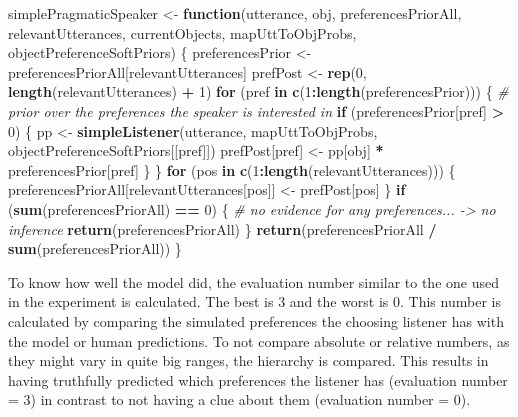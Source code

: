 \documentclass[]{article}
\newenvironment{Shaded}{\begin{snugshade}}{\end{snugshade}}
\newcommand{\CommentTok}[1]{\textcolor[rgb]{0.56,0.35,0.01}{\textit{#1}}}
\newcommand{\ControlFlowTok}[1]{\textcolor[rgb]{0.13,0.29,0.53}{\textbf{#1}}}
\newcommand{\DecValTok}[1]{\textcolor[rgb]{0.00,0.00,0.81}{#1}}
\newcommand{\KeywordTok}[1]{\textcolor[rgb]{0.13,0.29,0.53}{\textbf{#1}}}
\newcommand{\NormalTok}[1]{#1}
\newcommand{\OperatorTok}[1]{\textcolor[rgb]{0.81,0.36,0.00}{\textbf{#1}}}
\newcommand{\StringTok}[1]{\textcolor[rgb]{0.31,0.60,0.02}{#1}}
\begin{document}
\begin{Shaded}
\begin{Highlighting}[]
\NormalTok{simplePragmaticSpeaker <-}
\StringTok{  }\ControlFlowTok{function}\NormalTok{(utterance,}
\NormalTok{           obj,}
\NormalTok{           preferencesPriorAll,}
\NormalTok{           relevantUtterances,}
\NormalTok{           currentObjects,}
\NormalTok{           mapUttToObjProbs,}
\NormalTok{           objectPreferenceSoftPriors) \{}
\NormalTok{    preferencesPrior <-}\StringTok{ }\NormalTok{preferencesPriorAll[relevantUtterances]}
\NormalTok{    prefPost <-}\StringTok{ }\KeywordTok{rep}\NormalTok{(}\DecValTok{0}\NormalTok{, }\KeywordTok{length}\NormalTok{(relevantUtterances) }\OperatorTok{+}\StringTok{ }\DecValTok{1}\NormalTok{)}
    \ControlFlowTok{for}\NormalTok{ (pref }\ControlFlowTok{in} \KeywordTok{c}\NormalTok{(}\DecValTok{1}\OperatorTok{:}\KeywordTok{length}\NormalTok{(preferencesPrior))) \{}
      \CommentTok{# prior over the preferences the speaker is interested in}
      \ControlFlowTok{if}\NormalTok{ (preferencesPrior[pref] }\OperatorTok{>}\StringTok{ }\DecValTok{0}\NormalTok{) \{}
\NormalTok{        pp <-}
\StringTok{          }\KeywordTok{simpleListener}\NormalTok{(utterance,}
\NormalTok{                         mapUttToObjProbs,}
\NormalTok{                         objectPreferenceSoftPriors[[pref]])}
\NormalTok{        prefPost[pref] <-}\StringTok{ }\NormalTok{pp[obj] }\OperatorTok{*}\StringTok{ }\NormalTok{preferencesPrior[pref]}
\NormalTok{      \}}
\NormalTok{    \}}
    \ControlFlowTok{for}\NormalTok{ (pos }\ControlFlowTok{in} \KeywordTok{c}\NormalTok{(}\DecValTok{1}\OperatorTok{:}\KeywordTok{length}\NormalTok{(relevantUtterances))) \{}
\NormalTok{      preferencesPriorAll[relevantUtterances[pos]] <-}\StringTok{ }\NormalTok{prefPost[pos]}
\NormalTok{    \}}
    \ControlFlowTok{if}\NormalTok{ (}\KeywordTok{sum}\NormalTok{(preferencesPriorAll) }\OperatorTok{==}\StringTok{ }\DecValTok{0}\NormalTok{) \{}
      \CommentTok{# no evidence for any preferences... -> no inference}
      \KeywordTok{return}\NormalTok{(preferencesPriorAll)}
\NormalTok{    \}}
    \KeywordTok{return}\NormalTok{(preferencesPriorAll }\OperatorTok{/}\StringTok{ }\KeywordTok{sum}\NormalTok{(preferencesPriorAll))}
\NormalTok{  \}}
\end{Highlighting}
\end{Shaded}

To know how well the model did, the evaluation number similar to the one
used in the experiment is calculated. The best is 3 and the worst is 0.
This number is calculated by comparing the simulated preferences the
choosing listener has with the model or human predictions. To not
compare absolute or relative numbers, as they might vary in quite big
ranges, the hierarchy is compared. This results in having truthfully
predicted which preferences the listener has (evaluation number = 3) in
contrast to not having a clue about them (evaluation number = 0).
\end{document}
